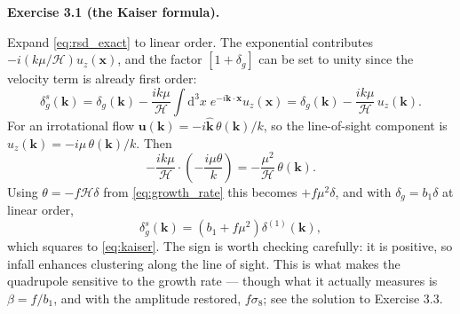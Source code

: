 \documentclass[a4paper,11pt]{article}
\newcommand{\vx}{\bm{x}}
\newcommand{\vk}{\bm{k}}
\newcommand{\vu}{\bm{u}}
\def\cH{\mathcal{H}}
\newcommand{\dd}{\mathrm{d}}
\newenvironment{solution}[1]
  {\par\medskip\noindent\textbf{#1}\par\nobreak\smallskip}
  {\par\medskip}
\begin{document}
\begin{solution}{Exercise 3.1 (the Kaiser formula).}
Expand \eqref{eq:rsd_exact} to linear order. The exponential contributes
$-i(k\mu/\cH)u_z(\vx)$, and the factor $[1+\delta_g]$ can be set to unity since
the velocity term is already first order:
\begin{equation*}
\delta_g^s(\vk) = \delta_g(\vk)
- \frac{ik\mu}{\cH}\int\!\dd^3x\;e^{-i\vk\cdot\vx}u_z(\vx)
= \delta_g(\vk) - \frac{ik\mu}{\cH}\,u_z(\vk) .
\end{equation*}
For an irrotational flow $\vu(\vk) = -i\hat{\vk}\,\theta(\vk)/k$, so the
line-of-sight component is $u_z(\vk) = -i\mu\,\theta(\vk)/k$. Then
\begin{equation*}
-\frac{ik\mu}{\cH}\cdot\left(-\frac{i\mu\theta}{k}\right)
= -\frac{\mu^2}{\cH}\,\theta(\vk) .
\end{equation*}
Using $\theta = -f\cH\delta$ from \eqref{eq:growth_rate} this becomes
$+f\mu^2\delta$, and with $\delta_g = b_1\delta$ at linear order,
\begin{equation*}
\delta_g^s(\vk) = \left(b_1 + f\mu^2\right)\delta^{(1)}(\vk) ,
\end{equation*}
which squares to \eqref{eq:kaiser}. The sign is worth checking carefully: it is
positive, so infall enhances clustering along the line of sight. This is what
makes the quadrupole sensitive to the growth rate --- though what it actually
measures is $\beta = f/b_1$, and with the amplitude restored, $f\sigma_8$; see
the solution to Exercise 3.3.
\end{solution}
\end{document}
